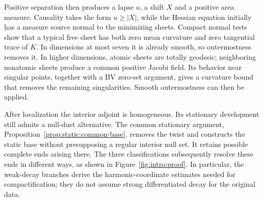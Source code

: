 Positive separation then produces a lapse $u$, a shift $X$ and a
positive area measure. Causality takes the form $u\ge|X|$, while the
Hessian equation initially has a measure source normal to the
minimizing sheets. Compact normal tests show that a typical free
sheet has both zero mean curvature and zero tangential trace of $K$.
In dimensions at most seven it is already smooth, so outermostness
removes it. In higher dimensions, atomic sheets are totally geodesic;
neighboring nonatomic sheets produce a common positive Jacobi field.
Its behavior near singular points, together with a BV zero-set
argument, gives a curvature bound that removes the remaining
singularities. Smooth outermostness can then be applied.

After localization the interior adjoint is homogeneous. Its stationary
development still admits a null-dust alternative. The common
stationary argument, Proposition~\ref{prop:static:common-base}, removes
the twist and constructs the static base without presupposing a
regular interior null set. It retains possible complete ends arising
there. The three classifications subsequently resolve these ends in
different ways, as shown in Figure~\ref{fig:intro:proof}. In particular,
the weak-decay branches derive the harmonic-coordinate estimates
needed for compactification; they do not assume strong differentiated
decay for the original data.

